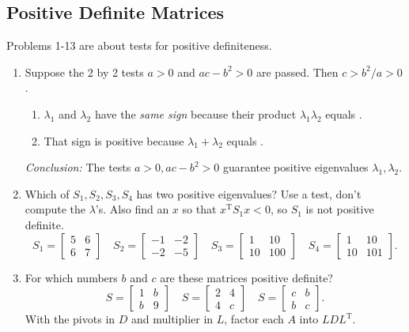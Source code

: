 \documentclass[14pt, a4paper]{article}
\begin{document}
\subsection{Positive Definite Matrices}
\noindent Problems 1-13 are about tests for positive definiteness.
\begin{enumerate}
    \item Suppose the 2 by 2 tests $a > 0$ and $ac - b^2 > 0$ are passed. Then $c > b^2/a > 0$.
          \begin{enumerate}
              \item $\lambda_1$ and $\lambda_2$ have the \textit{same sign} because their product $\lambda_1\lambda_2$ equals \underline{\hspace{1cm}}.
              \item That sign is positive because $\lambda_1 + \lambda_2$ equals \underline{\hspace{1cm}}.
          \end{enumerate}
          \textit{Conclusion:} The tests $a > 0, ac - b^2 > 0$ guarantee positive eigenvalues $\lambda_1, \lambda_2$.

    \item Which of $S_1, S_2, S_3, S_4$ has two positive eigenvalues? Use a test, don't compute the $\lambda$'s. Also find an $x$ so that $x^{\mathrm{T}}S_1x < 0$, so $S_1$ is not positive definite.
          \[
              S_1 = \begin{bmatrix} 5 & 6 \\ 6 & 7 \end{bmatrix} \quad S_2 = \begin{bmatrix} -1 & -2 \\ -2 & -5 \end{bmatrix} \quad S_3 = \begin{bmatrix} 1 & 10 \\ 10 & 100 \end{bmatrix} \quad S_4 = \begin{bmatrix} 1 & 10 \\ 10 & 101 \end{bmatrix}.
          \]

    \item For which numbers $b$ and $c$ are these matrices positive definite?
          \[
              S = \begin{bmatrix} 1 & b \\ b & 9 \end{bmatrix} \quad S = \begin{bmatrix} 2 & 4 \\ 4 & c \end{bmatrix} \quad S = \begin{bmatrix} c & b \\ b & c \end{bmatrix}.
          \]
          With the pivots in $D$ and multiplier in $L$, factor each $A$ into $LDL^{\mathrm{T}}$.


\end{enumerate}
\end{document}
